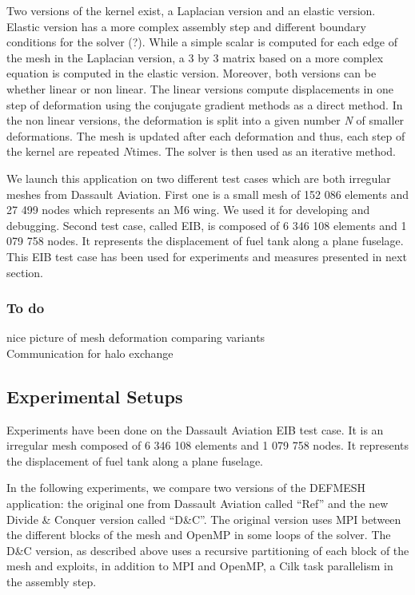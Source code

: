 \documentclass{IOS-Book-Article}
\begin{document}
Two versions of the kernel exist, a Laplacian version and an elastic version. Elastic version has a more complex assembly step and different boundary conditions for the solver (?).
While a simple scalar is computed for each edge of the mesh in the Laplacian version, a 3 by 3 matrix based on a more complex equation is computed in the elastic version.
Moreover, both versions can be whether linear or non linear.
The linear versions compute displacements in one step of deformation using the conjugate gradient methods as a direct method.
In the non linear versions, the deformation is split into a given number \emph{N} of smaller deformations.
The mesh is updated after each deformation and thus, each step of the kernel are repeated $N$times. The solver is then used as an iterative method.

We launch this application on two different test cases which are both irregular meshes from Dassault Aviation.
First one is a small mesh of 152 086 elements and 27 499 nodes which represents an M6 wing. We used it for developing and debugging.
Second test case, called EIB, is composed of 6 346 108 elements and 1 079 758 nodes. It represents the displacement of fuel tank along a plane fuselage.
This EIB test case has been used for experiments and measures presented in next section.

\subsubsection{To do}
nice picture of mesh deformation comparing variants\\
Communication for halo exchange\\

\subsection{Experimental Setups}
Experiments have been done on the Dassault Aviation EIB test case. It is an irregular mesh composed of 6 346 108 elements and 1 079 758 nodes.
It represents the displacement of fuel tank along a plane fuselage.

In the following experiments, we compare two versions of the DEFMESH application: the original one from Dassault Aviation called “Ref” and the new
Divide \& Conquer version called “D\&C”. The original version uses MPI between the different blocks of the mesh and OpenMP in some loops of the solver.
The D\&C version, as described above uses a recursive partitioning of each block of the mesh and exploits, in addition to MPI and OpenMP, a Cilk task parallelism
in the assembly step.
\end{document}
